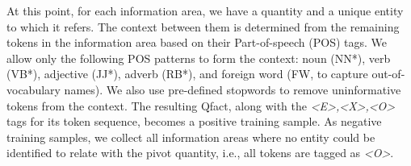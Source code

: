 At this point, for each information area, we have a quantity and a unique entity to which it refers. 
The context between them is determined from the remaining tokens in the information area based on their Part-of-speech (POS) tags. 
We allow only the following POS patterns to form the context: noun (NN*), verb (VB*), adjective (JJ*), adverb (RB*), and 
foreign  word (FW, to capture out-of-vocabulary names). 
We also use pre-defined stopwords to remove uninformative tokens from the context. 
The resulting Qfact, along with the \textit{<E>,<X>,<O>} tags for its token sequence, becomes a positive training sample.
As negative training samples, we collect all information areas where no entity could be identified to relate with the
pivot quantity, i.e., all tokens are tagged as \textit{<O>}.



 